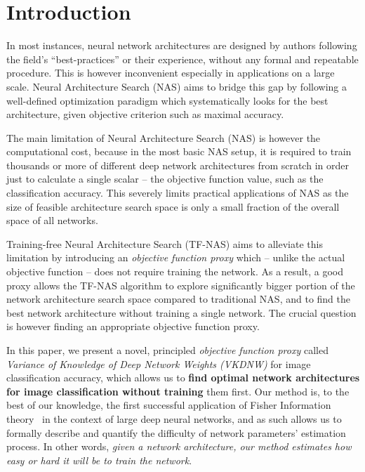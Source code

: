 \vspace{-5pt}
\section{Introduction}
\label{sec:intro}

In most instances, neural network architectures are designed by authors following the field's ``best-practices'' or their experience, without any formal and repeatable procedure. This is however inconvenient especially in applications on a large scale. Neural Architecture Search (NAS) aims to bridge this gap by following a well-defined optimization paradigm which systematically looks for the best architecture, given objective criterion such as maximal accuracy.



The main limitation of Neural Architecture Search (NAS) is however the computational cost, because in the most basic NAS setup, it is required to train thousands or more of different deep network architectures from scratch in order just to calculate a single scalar  -- the objective function value, such as the classification accuracy. This severely limits practical applications of NAS as the size of feasible architecture search space is only a small fraction of the overall space of all networks.

Training-free Neural Architecture Search (TF-NAS) aims to alleviate this limitation by introducing an \textit{objective function proxy} which -- unlike the actual objective function -- does not require training the network. As a result, a good proxy allows the TF-NAS algorithm to explore significantly bigger portion of the network architecture search space compared to traditional NAS, and to find the best network architecture without training a single network. The crucial question is however finding an appropriate objective function proxy.

In this paper, we present a novel, principled \textit{objective function proxy} called \textit{Variance of Knowledge of Deep Network Weights (VKDNW)} for image classification accuracy, which allows us to \textbf{find optimal network architectures for image classification without training} them first. Our method is, to the best of our knowledge, the first successful application of Fisher Information theory~\cite{ly2017tutorial} in the context of large deep neural networks, and as such allows us to formally describe and quantify the difficulty of network parameters' estimation process. In other words, \textit{given a network architecture, our method estimates how easy or hard it will be to train the network}.


